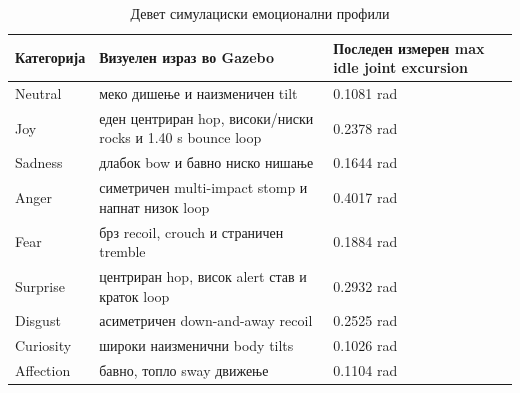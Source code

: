 \begin{table}[htbp]
\centering
\caption{Девет симулациски емоционални профили}
\label{tab:sim-emotions}
\small
\begin{tabularx}{\textwidth}{L{0.15\textwidth}YL{0.24\textwidth}}
\toprule
\textbf{Категорија} & \textbf{Визуелен израз во Gazebo} & \textbf{Последен измерен max idle joint excursion} \\
\midrule
Neutral & меко дишење и наизменичен tilt & 0.1081 rad \\
Joy & еден центриран hop, високи/ниски rocks и 1.40 s bounce loop & 0.2378 rad \\
Sadness & длабок bow и бавно ниско нишање & 0.1644 rad \\
Anger & симетричен multi-impact stomp и напнат низок loop & 0.4017 rad \\
Fear & брз recoil, crouch и страничен tremble & 0.1884 rad \\
Surprise & центриран hop, висок alert став и краток loop & 0.2932 rad \\
Disgust & асиметричен down-and-away recoil & 0.2525 rad \\
Curiosity & широки наизменични body tilts & 0.1026 rad \\
Affection & бавно, топло sway движење & 0.1104 rad \\
\bottomrule
\end{tabularx}
\end{table}
